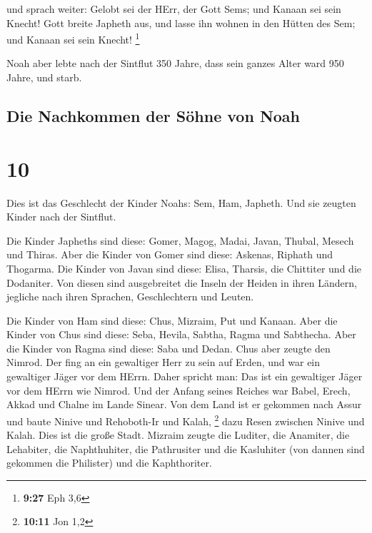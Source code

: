  und sprach weiter: Gelobt sei der HErr, der Gott Sems;
und Kanaan sei sein Knecht!  Gott breite Japheth aus, und
lasse ihn wohnen in den Hütten des Sem; und Kanaan sei sein Knecht!
\footnote{\textbf{9:27} Eph 3,6}

 Noah aber lebte nach der Sintflut 350 Jahre,
 dass sein ganzes Alter ward 950 Jahre, und starb.

\hypertarget{die-nachkommen-der-suxf6hne-von-noah}{%
\subsection{Die Nachkommen der Söhne von
Noah}\label{die-nachkommen-der-suxf6hne-von-noah}}

\hypertarget{section-9}{%
\section{10}\label{section-9}}

 Dies ist das Geschlecht der Kinder Noahs: Sem, Ham,
Japheth. Und sie zeugten Kinder nach der Sintflut.

 Die Kinder Japheths sind diese: Gomer, Magog, Madai,
Javan, Thubal, Mesech und Thiras.  Aber die Kinder von
Gomer sind diese: Askenas, Riphath und Thogarma.  Die
Kinder von Javan sind diese: Elisa, Tharsis, die Chittiter und die
Dodaniter.  Von diesen sind ausgebreitet die Inseln der
Heiden in ihren Ländern, jegliche nach ihren Sprachen, Geschlechtern und
Leuten.

 Die Kinder von Ham sind diese: Chus, Mizraim, Put und
Kanaan.  Aber die Kinder von Chus sind diese: Seba,
Hevila, Sabtha, Ragma und Sabthecha. Aber die Kinder von Ragma sind
diese: Saba und Dedan.  Chus aber zeugte den Nimrod. Der
fing an ein gewaltiger Herr zu sein auf Erden,  und war
ein gewaltiger Jäger vor dem HErrn. Daher spricht man: Das ist ein
gewaltiger Jäger vor dem HErrn wie Nimrod.  Und der
Anfang seines Reiches war Babel, Erech, Akkad und Chalne im Lande
Sinear.  Von dem Land ist er gekommen nach Assur und
baute Ninive und Rehoboth-Ir und Kalah, \footnote{\textbf{10:11} Jon 1,2}
 dazu Resen zwischen Ninive und Kalah. Dies ist die große
Stadt.  Mizraim zeugte die Luditer, die Anamiter, die
Lehabiter, die Naphthuhiter,  die Pathrusiter und die
Kasluhiter (von dannen sind gekommen die Philister) und die
Kaphthoriter.


